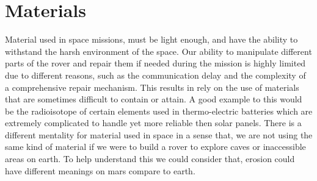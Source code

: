 \section{Materials}

Material used in space missions, must be light enough, and have the ability to withstand the harsh environment of the space.
 Our ability to manipulate different parts of the rover and repair them if needed during the mission is highly limited due to different reasons, such as the communication delay and the complexity of a comprehensive repair mechanism. This results in rely on the use of materials that are sometimes difficult to contain or attain. A good example to this would be the radioisotope of certain elements used in thermo-electric batteries which are extremely complicated to handle yet more reliable then solar panels\cite{NuclearPower}. 
 There is a different mentality for material used in space in a sense that, we are not using the same kind of material if we were to build a rover to explore caves or inaccessible areas on earth. To help understand this we could consider that, erosion could have different meanings on mars compare to earth. 
\\